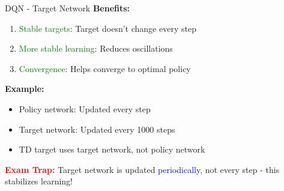 \documentclass[8pt]{beamer}
\begin{document}
\begin{frame}{DQN - Target Network}
		\textbf{Benefits:}
		\begin{enumerate}
			\item \textcolor{green}{Stable targets}: Target doesn't change every step
			\item \textcolor{green}{More stable learning}: Reduces oscillations
			\item \textcolor{green}{Convergence}: Helps converge to optimal policy
		\end{enumerate}
		
		\textbf{Example:}
		\begin{itemize}
			\item Policy network: Updated every step
			\item Target network: Updated every 1000 steps
			\item TD target uses target network, not policy network
		\end{itemize}
		
		\textcolor{red}{\textbf{Exam Trap:}} Target network is updated \textcolor{blue}{periodically}, not every step - this stabilizes learning!
	\end{frame}
	
\end{document}
